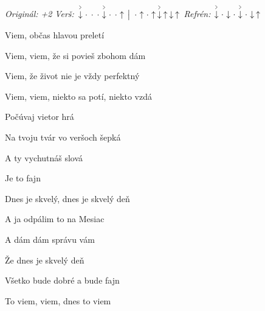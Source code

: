 \begin{song}


\begin{headerbox}
\RaiseBoxWithAccents
\textit{Originál: +2} \quad
\textit{Verš:} $\AccentDown\Miss\Miss\Miss\AccentDown\Miss\Miss\Up \Separator \Miss\Up\Miss\Up\AccentDown\Up\Down\Up$ \quad
\textit{Refrén:} $\AccentDown\Miss\Down\Miss\AccentDown\Miss\Down\Up$
\end{headerbox}

\begin{hchordbox}
\end{hchordbox}

\Large

\bigskip

 Viem, občas hlavou preletí \par
Viem, viem, že si povieš zbohom dám  \par
{} Viem, že život nie je vždy perfektný \par
Viem, viem, niekto sa potí, niekto vzdá  \par

\bigskip

\begin{chorusbox}{\PredrefrenARefren}
Počúvaj vietor hrá  \par
{}Na tvoju tvár vo veršoch šepká \par
A ty vychutnáš slová \par
Je to fajn \par

\bigskip

Dnes je skvelý, dnes je skvelý deň \par
A ja odpálim to na Mesiac \par
A dám dám správu vám \par

\bigskip

Že dnes je skvelý deň \par
Všetko bude dobré a bude fajn \par
To viem, viem, dnes to viem \par
\end{chorusbox}


\end{song}
